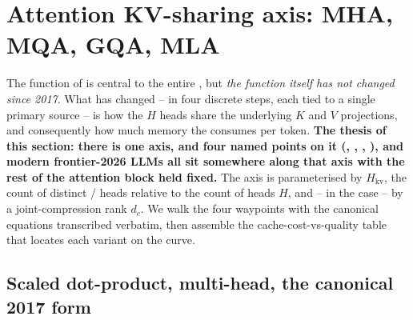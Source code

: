 
\section{Attention KV-sharing axis: MHA, MQA, GQA, MLA}
\label{sec:attention-kv-sharing}
\label{sec:kv}
\label{sec:kv-sharing}
\label{sec:attention-mechanism-axis}

The  function of \citet{vaswani2017} is
central to the entire , but \emph{the function itself
has not changed since 2017}. What has changed -- in four discrete steps,
each tied to a single primary source -- is how the $H$  heads
share the underlying $K$ and $V$ projections, and consequently how
much memory the   consumes per token.
\textbf{The thesis of this section: there is one axis, and four
named points on it (, , , ), and modern frontier-2026
LLMs all sit somewhere along that axis with the rest of the
attention block held fixed.} The axis is parameterised by
$H_{\mathrm{kv}}$, the count of distinct / heads relative to
the count of  heads $H$, and -- in the  case -- by a
joint-compression rank $d_c$. We walk the four waypoints with the
canonical equations transcribed verbatim, then assemble the
cache-cost-vs-quality table that locates each variant on the curve.

\subsection{Scaled dot-product, multi-head, the canonical 2017 form}
\label{sec:attn-canonical}

